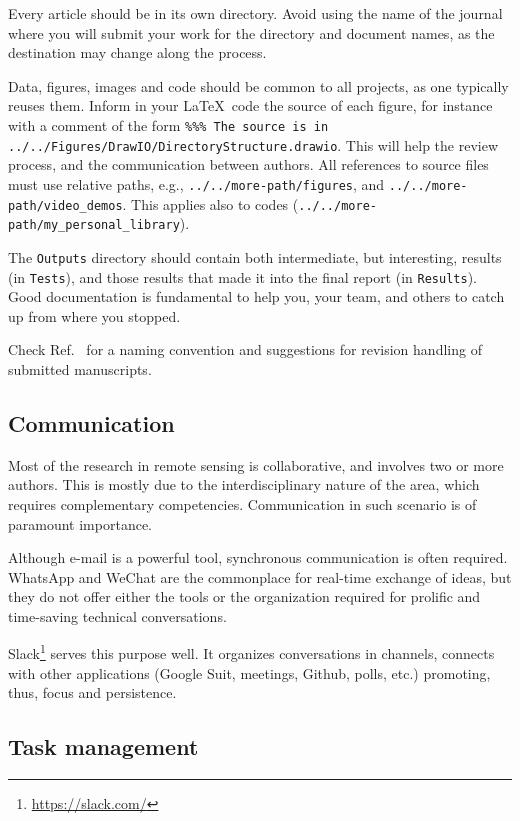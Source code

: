 \documentclass[journal,twoside]{IEEEtran}
\begin{document}
Every article should be in its own directory.
Avoid using the name of the journal where you will submit your work for the directory and document names, as the destination may change along the process.

Data, figures, images and code should be common to all projects, as one typically reuses them.
Inform in your \LaTeX\ code the source of each figure, for instance with a comment of the form \texttt{\%\%\% The source is in ../../Figures/DrawIO/DirectoryStructure.drawio}.
This will help the review process, and the communication between authors. 
All references to source files must use relative paths, e.g., \texttt{../../more-path/figures}, and \texttt{../../more-path/video\_demos}. 
This applies also to codes (\texttt{../../more-path/my\_personal\_library}).


The \verb|Outputs| directory should contain both intermediate, but interesting, results (in \verb|Tests|), and those results that made it into the final report (in \verb|Results|).
Good documentation is fundamental to help you, your team, and others to catch up from where you stopped.	

Check Ref.~\cite{EditorialGRSL2015} for a naming convention and suggestions for revision handling of submitted manuscripts.

\subsection{Communication}

Most of the research in remote sensing is collaborative, and involves two or more authors.
This is mostly due to the interdisciplinary nature of the area, which requires complementary competencies.
Communication in such scenario is of paramount importance.

Although e-mail is a powerful tool, synchronous communication is often required.
WhatsApp and WeChat are the commonplace for real-time exchange of ideas, but they do not offer either the tools or the organization required for prolific and time-saving technical conversations.

Slack\footnote{\url{https://slack.com/}} serves this purpose well.
It organizes conversations in channels, connects with other applications (Google Suit, meetings, Github, polls, etc.) promoting, thus, focus and persistence.

\subsection{Task management}
\end{document}
